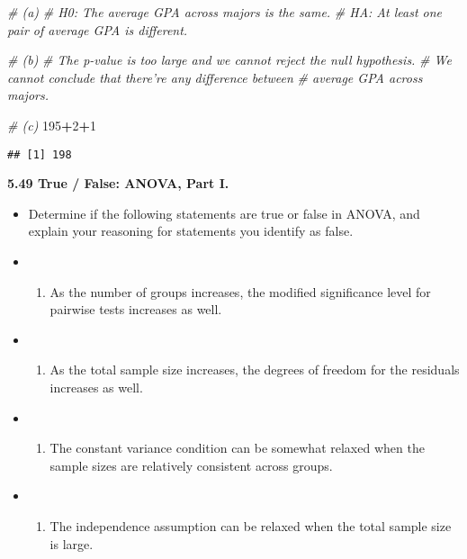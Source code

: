 \documentclass[]{book}
\newenvironment{Shaded}{\begin{snugshade}}{\end{snugshade}}
\newcommand{\CommentTok}[1]{\textcolor[rgb]{0.56,0.35,0.01}{\textit{#1}}}
\newcommand{\DecValTok}[1]{\textcolor[rgb]{0.00,0.00,0.81}{#1}}
\newcommand{\OperatorTok}[1]{\textcolor[rgb]{0.81,0.36,0.00}{\textbf{#1}}}
\providecommand{\tightlist}{%
  \setlength{\itemsep}{0pt}\setlength{\parskip}{0pt}}
\begin{document}
\begin{Shaded}
\begin{Highlighting}[]
\CommentTok{# (a)}
\CommentTok{# H0: The average GPA across majors is the same.}
\CommentTok{# HA: At least one pair of average GPA is different.}
\end{Highlighting}
\end{Shaded}

\begin{Shaded}
\begin{Highlighting}[]
\CommentTok{# (b)}
\CommentTok{# The p-value is too large and we cannot reject the null hypothesis.}
\CommentTok{# We cannot conclude that there're any difference between }
\CommentTok{# average GPA across majors.}
\end{Highlighting}
\end{Shaded}

\begin{Shaded}
\begin{Highlighting}[]
\CommentTok{# (c)}
\DecValTok{195}\OperatorTok{+}\DecValTok{2}\OperatorTok{+}\DecValTok{1}
\end{Highlighting}
\end{Shaded}

\begin{verbatim}
## [1] 198
\end{verbatim}

\textbf{5.49 True / False: ANOVA, Part I.}

\begin{itemize}
\item
  Determine if the following statements are true or false in ANOVA, and explain your reasoning for statements you identify as false.
\item
  \begin{enumerate}
  \def\labelenumi{(\alph{enumi})}
  \tightlist
  \item
    As the number of groups increases, the modified significance level for pairwise tests increases as well.
  \end{enumerate}
\item
  \begin{enumerate}
  \def\labelenumi{(\alph{enumi})}
  \setcounter{enumi}{1}
  \tightlist
  \item
    As the total sample size increases, the degrees of freedom for the residuals increases as well.
  \end{enumerate}
\item
  \begin{enumerate}
  \def\labelenumi{(\alph{enumi})}
  \setcounter{enumi}{2}
  \tightlist
  \item
    The constant variance condition can be somewhat relaxed when the sample sizes are relatively consistent across groups.
  \end{enumerate}
\item
  \begin{enumerate}
  \def\labelenumi{(\alph{enumi})}
  \setcounter{enumi}{3}
  \tightlist
  \item
    The independence assumption can be relaxed when the total sample size is large.
  \end{enumerate}
\end{itemize}
\end{document}
